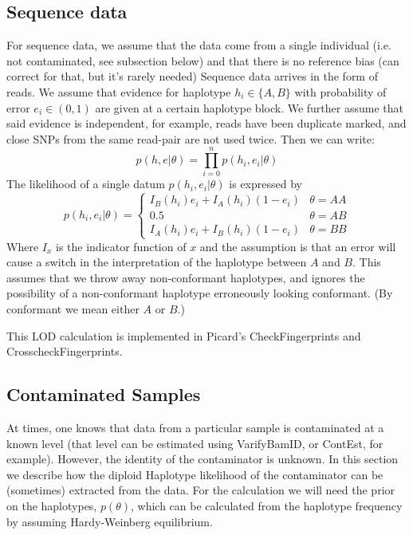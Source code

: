 \documentclass[12pt]{article}
\begin{document}
\subsection{Sequence data}
For sequence data, we assume that the data come from a single individual (i.e. not contaminated, see subsection below) and that there is no reference bias (can correct for that, but it's rarely needed)
Sequence data arrives in the form of reads. 
We assume that evidence for haplotype $h_i\in\{A,B\}$ with probability of error $e_i\in(0,1)$ are given at a certain haplotype block.
We further assume that said evidence is independent, for example, reads have been duplicate marked, and close SNPs from the same read-pair are not used twice.
Then we can write:
\begin{equation}
p(h,e|\theta)=\prod_{i=0}^n p(h_i,e_i|\theta)
\end{equation}
The likelihood of a single datum $p(h_i,e_i|\theta)$ is expressed by
\begin{equation}
p(h_i,e_i|\theta)=\begin{cases}
I_B(h_i)e_i + I_A(h_i)(1-e_i) & \theta=AA\\
0.5 & \theta=AB\\
I_A(h_i)e_i + I_B(h_i)(1-e_i) &  \theta=BB
\end{cases}
\end{equation}
Where $I_x$ is the indicator function of $x$ and the assumption is that an error will cause a switch in the interpretation of the haplotype between $A$ and $B$.
This assumes that we throw away non-conformant haplotypes, and ignores the possibility of a non-conformant haplotype erroneously looking conformant. 
(By conformant we mean either $A$ or $B$.)

This LOD calculation is implemented in Picard's CheckFingerprints and CrosscheckFingerprints.

\subsection{Contaminated Samples}
At times, one knows that data from a particular sample is contaminated at a known level (that level can be estimated using VarifyBamID, or ContEst, for example). 
However, the identity of the contaminator is unknown. 
In this section we describe how the diploid Haplotype likelihood of the contaminator can be (sometimes) extracted from the data.
For the calculation we will need the prior on the haplotypes, $p(\theta)$, which can be calculated from the haplotype frequency by assuming Hardy-Weinberg equilibrium.
\end{document}
